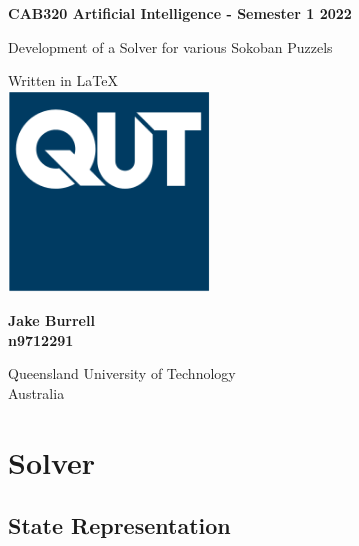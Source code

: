 \documentclass[a4paper,12pt]{article}
\begin{document}
\begin{titlepage}
   \begin{center}
       \vspace*{1cm}
 
       \textbf{CAB320 Artificial Intelligence - Semester 1 2022}
 
       \vspace{0.5cm}
        \LARGE{Development of a Solver for various Sokoban Puzzels}
 
       \vspace{1.5cm}

       \vfill
       
       \vspace{0.8cm}
       \normalsize
 	   Written in \LaTeX \\
       \includegraphics[width=0.4\textwidth]{QUT}

       \large
       \textbf{Jake Burrell}\\
       \textbf{n9712291}

       \vspace{1.5cm}
 
       \normalsize
       Queensland University of Technology\\
       Australia\\ 
   \end{center}
\end{titlepage}

\tableofcontents

\section{Solver}
\subsection{State Representation}
\end{document}
